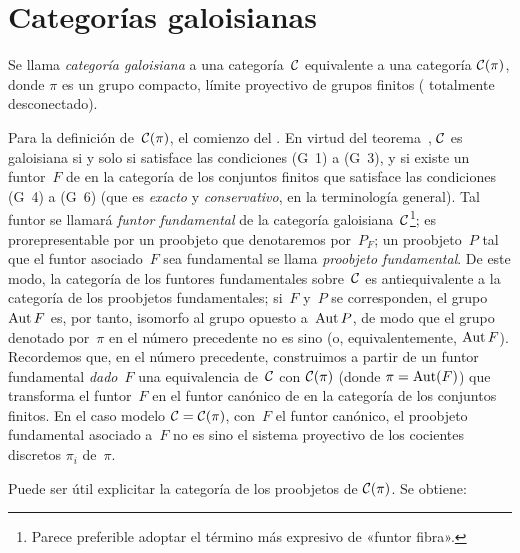 
\section{Categorías galoisianas}
\label{V.5}

\begin{definition}
\label{V.5.1}
Se llama \emph{categoría galoisiana}
%
a una categoría~$\cal{C}$ equivalente a una categoría $\cal{C}(\pi)$, donde
$\pi$ es un grupo compacto, límite proyectivo de grupos finitos (\ie
totalmente desconectado).

Para la definición de~$\cal{C}(\pi)$, \cf el comienzo del \No {}. En
virtud del teorema~, $\cal{C}$ es galoisiana si y solo si
satisface las condiciones (G~1) a (G~3), y si existe un funtor~$F$ de
en la categoría de los conjuntos finitos que satisface las condiciones
(G~4) a (G~6) (\ie que es \emph{exacto} y \emph{conservativo}, en la
terminología general). Tal funtor se llamará \emph{funtor fundamental}
%
de la categoría galoisiana~$\cal{C}$\kern1pt\footnote{Parece preferible
adoptar el término más expresivo de «funtor fibra».};
%
es prorepresentable por un proobjeto que denotaremos por~$P_F$; un
proobjeto~$P$ tal que el funtor asociado~$F$ sea fundamental se llama
\emph{proobjeto fundamental}.
%
De este modo, la categoría de los funtores fundamentales sobre~$\cal{C}$ es
antiequivalente a la categoría de los proobjetos fundamentales; si~$F$ y~$P$
se corresponden, el grupo $\Aut F$ es, por tanto, isomorfo al grupo opuesto
a~$\Aut P$, de modo que el grupo denotado por~$\pi$ en el número precedente
no es sino
(o, equivalentemente, $\Aut F$). Recordemos que, en el número precedente,
construimos a partir de un funtor fundamental \emph{dado}~$F$ una
equivalencia de~$\cal{C}$ con $\cal{C}(\pi)$ (donde $\pi=\Aut(F)$) que
transforma el funtor~$F$ en el funtor canónico de
en la categoría de los conjuntos finitos. En el caso modelo
$\cal{C}=\cal{C}(\pi)$, con~$F$ el funtor canónico, el proobjeto fundamental
asociado a~$F$ no es sino el sistema proyectivo de los cocientes discretos
$\pi_i$ de~$\pi$.
\end{definition}

Puede ser útil explicitar la categoría de los proobjetos de
$\cal{C}(\pi)$. Se obtiene:


